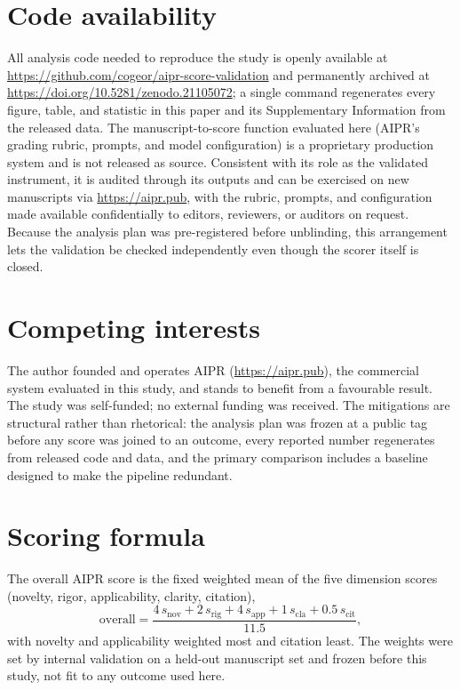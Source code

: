 \documentclass[11pt]{article}
\begin{document}
\section*{Code availability}
All analysis code needed to reproduce the study is openly available at
\url{https://github.com/cogeor/aipr-score-validation} and permanently archived at
\url{https://doi.org/10.5281/zenodo.21105072}; a single command regenerates every figure,
table, and statistic in this paper and its Supplementary Information from the released data. The
manuscript-to-score function evaluated here (AIPR's grading rubric, prompts, and model
configuration) is a proprietary production system and is not released as source.
Consistent with its role as the validated instrument, it is audited through its outputs and
can be exercised on new manuscripts via \url{https://aipr.pub}, with the rubric, prompts, and
configuration made available confidentially to editors, reviewers, or auditors on request.
Because the analysis plan was pre-registered before unblinding, this arrangement lets the
validation be checked independently even though the scorer itself is closed.

\section*{Competing interests}
The author founded and operates AIPR (\url{https://aipr.pub}), the commercial system evaluated
in this study, and stands to benefit from a favourable result. The study was self-funded; no
external funding was received. The mitigations are structural rather than rhetorical: the
analysis plan was frozen at a public tag before any score was joined to an outcome, every
reported number regenerates from released code and data, and the primary comparison includes
a baseline designed to make the pipeline redundant.




\appendix
\renewcommand{\appendixname}{Supplementary Information}

\section{Scoring formula}
The overall AIPR score is the fixed weighted mean of the five dimension scores (novelty,
rigor, applicability, clarity, citation),
\begin{equation}
  \text{overall} = \frac{4\,s_{\text{nov}} + 2\,s_{\text{rig}}
  + 4\,s_{\text{app}} + 1\,s_{\text{cla}} + 0.5\,s_{\text{cit}}}{11.5},
  \label{eq:overall}
\end{equation}
with novelty and applicability weighted most and citation least. The weights were set by
internal validation on a held-out manuscript set and frozen before this study, not fit to
any outcome used here.




\end{document}
